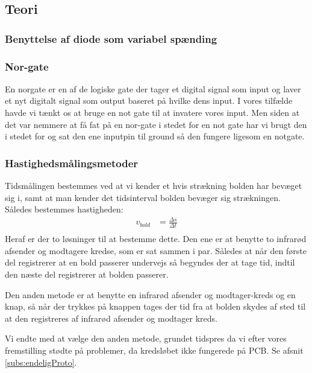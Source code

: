 \subsection{Teori}
\subsubsection{Benyttelse af diode som variabel spænding}
\subsubsection{Nor-gate}
En norgate er en af de logiske gate der tager et digital signal som input og laver et nyt digitalt signal som output baseret på hvilke dens input. I vores tilfælde havde vi tænkt os at bruge en not gate til at invatere vores input. Men siden at det var nemmere at få fat på en nor-gate i stedet for en not gate har vi brugt den i stedet for og sat den ene inputpin til ground så den fungere ligesom en notgate.
\subsubsection{Hastighedsmålingsmetoder}
Tidsmålingen bestemmes ved at vi kender et hvis strækning bolden har bevæget sig i, samt at man kender det tidsinterval bolden bevæger sig strækningen. Således bestemmes hastigheden:
\begin{align}
	v_{bold} &=\frac{\Delta s}{\Delta t} \\
\end{align}
 Heraf er der to løsninger til at bestemme dette.
Den ene er at benytte to infrarød afsender og modtagere kredse, som er sat sammen i par. Således at når den første del registrerer at en bold passerer undervejs så begyndes der at tage tid, indtil den næste del registrerer at bolden passerer. 

Den anden metode er at benytte en infrarød afsender og modtager-kreds og en knap, så når der trykkes på knappen tages der tid fra at bolden skydes af sted til at den registreres af infrarød afsender og modtager kreds.

Vi endte med at vælge den anden metode, grundet tidspres da vi efter vores fremstilling stødte på problemer, da kredsløbet ikke fungerede på PCB. Se afsnit \ref{subs:endeligProto}.








